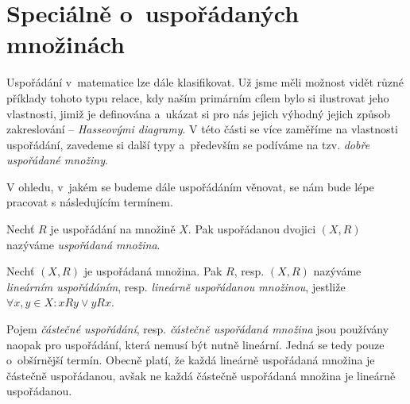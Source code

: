 \section{Speciálně o~uspořádaných množinách}\label{sec:specialne_o_usporadanych_mozinach}
Uspořádání v~matematice lze dále klasifikovat. Už jsme měli možnost vidět různé příklady tohoto typu relace, kdy naším primárním cílem bylo si ilustrovat jeho vlastnosti, jimiž je definována a~ukázat si pro nás jejich výhodný jejich způsob zakreslování -- \emph{Hasseovými diagramy}. V této části se více zaměříme na vlastnosti uspořádání, zavedeme si další typy a~především se podíváme na tzv. \emph{dobře uspořádané množiny}.\par
V ohledu, v~jakém se budeme dále uspořádáním věnovat, se nám bude lépe pracovat s následujícím termínem.
\begin{definition}
    Nechť $R$ je uspořádání na množině $X$. Pak uspořádanou dvojici $(X,R)$ nazýváme \emph{uspořádaná množina}.
\end{definition}
\begin{definition}
    Nechť $(X,R)$ je uspořádaná množina. Pak $R$, resp. $(X,R)$ nazýváme \emph{lineárním uspořádáním}, resp. \emph{lineárně uspořádanou množinou}, jestliže $\forall x,y\in X: xRy \lor yRx$.
\end{definition}
Pojem \emph{částečné uspořádání}, resp. \emph{částečně uspořádaná množina} jsou používány naopak pro uspořádání, která nemusí být nutně lineární. Jedná se tedy pouze o~obšírnější termín. Obecně platí, že každá lineárně uspořádaná množina je částečně uspořádanou, avšak ne každá částečně uspořádaná množina je lineárně uspořádanou.
